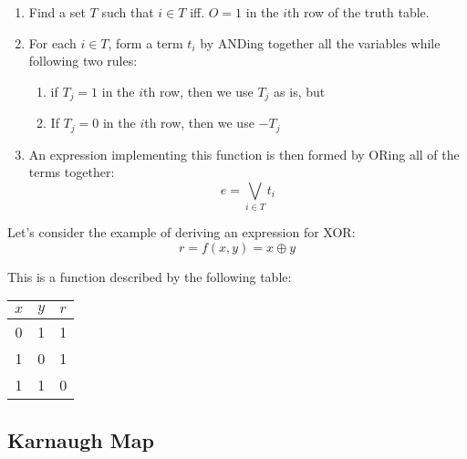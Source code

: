 \documentclass[11pt,a4paper,titlepage,dvipsnames,cmyk]{scrartcl}
\begin{document}
\begin{enumerate}
    \item Find a set $T$ such that $i \in T$ iff. $O = 1$ in the $i$th row
        of the truth table.
    \item For each $i \in T$, form a term $t_i$ by ANDing together all the
        variables while following two rules:
        \begin{enumerate}
            \item if $T_j = 1$ in the $i$th row, then we use $T_j$ as is,
                but
            \item If $T_j = 0$ in the $i$th row, then we use $-T_j$
        \end{enumerate}
    \item An expression implementing this function is then formed by ORing
        all of the terms together:
        \begin{equation*}
            e = \bigvee_{i \in T} t_i
        \end{equation*}
\end{enumerate}

Let's consider the example of deriving an expression for XOR:
\begin{equation*}
    r = f(x,y) = x \oplus y
\end{equation*}

This is a function described by the following table:
\begin{center}
    \begin{tabular}{|c c|c|}
        \hline
        $x$ & $y$ & $r$ \\
        \hline
        0 & 1 & 1 \\
        \hline
        1 & 0 & 1 \\
        \hline
        1 & 1 & 0 \\
        \hline
    \end{tabular}
\end{center}

\subsection{Karnaugh Map}%
\label{sub:karnaugh}
\end{document}
